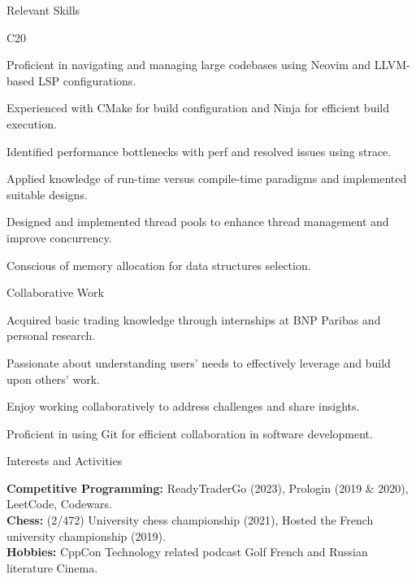 \documentclass[
	a4paper, %
	10pt, %
]{resume} %
\def\CC{{C\nolinebreak[4]\hspace{-.05em}\raisebox{.4ex}{\tiny\bf ++}}}
\begin{document}
\begin{rSection}{Relevant Skills}
	\begin{rSubsection}{\CC20}{}{}{}
    \item Proficient in navigating and managing large codebases using Neovim and LLVM-based LSP configurations.
    \item Experienced with CMake for build configuration and Ninja for efficient build execution.
    \item Identified performance bottlenecks with perf and resolved issues using strace.
    \item Applied knowledge of run-time versus compile-time paradigms and implemented suitable designs.
    \item Designed and implemented thread pools to enhance thread management and improve concurrency.
    \item Conscious of memory allocation for data structures selection.
	\end{rSubsection}
  \begin{rSubsection}{Collaborative Work}{}{}{}
    \item Acquired basic trading knowledge through internships at BNP Paribas and personal research.
    \item Passionate about understanding users' needs to effectively leverage and build upon others’ work.
    \item Enjoy working collaboratively to address challenges and share insights.
    \item Proficient in using Git for efficient collaboration in software development.
  \end{rSubsection}
\end{rSection}


\begin{rSection}{Interests and Activities}

	\textbf{Competitive Programming:} ReadyTraderGo (2023), Prologin (2019 \& 2020), LeetCode, Codewars. \\
	\textbf{Chess:} (2/472) University chess championship (2021), Hosted the French university championship (2019).\\
  \textbf{Hobbies:} CppCon  Technology related podcast  Golf  French and Russian literature  Cinema.
\end{rSection}
\end{document}
